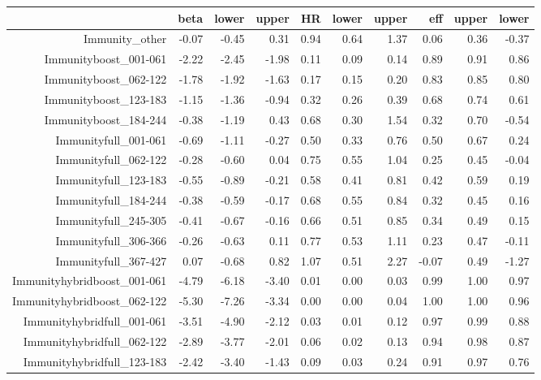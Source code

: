 \begin{table}[ht]
\centering
\begin{tabular}{rrrrrrrrrr}
  \hline
 & beta & lower & upper & HR & lower & upper & eff & upper & lower \\ 
  \hline
Immunity\_other & -0.07 & -0.45 & 0.31 & 0.94 & 0.64 & 1.37 & 0.06 & 0.36 & -0.37 \\ 
  Immunityboost\_001-061 & -2.22 & -2.45 & -1.98 & 0.11 & 0.09 & 0.14 & 0.89 & 0.91 & 0.86 \\ 
  Immunityboost\_062-122 & -1.78 & -1.92 & -1.63 & 0.17 & 0.15 & 0.20 & 0.83 & 0.85 & 0.80 \\ 
  Immunityboost\_123-183 & -1.15 & -1.36 & -0.94 & 0.32 & 0.26 & 0.39 & 0.68 & 0.74 & 0.61 \\ 
  Immunityboost\_184-244 & -0.38 & -1.19 & 0.43 & 0.68 & 0.30 & 1.54 & 0.32 & 0.70 & -0.54 \\ 
  Immunityfull\_001-061 & -0.69 & -1.11 & -0.27 & 0.50 & 0.33 & 0.76 & 0.50 & 0.67 & 0.24 \\ 
  Immunityfull\_062-122 & -0.28 & -0.60 & 0.04 & 0.75 & 0.55 & 1.04 & 0.25 & 0.45 & -0.04 \\ 
  Immunityfull\_123-183 & -0.55 & -0.89 & -0.21 & 0.58 & 0.41 & 0.81 & 0.42 & 0.59 & 0.19 \\ 
  Immunityfull\_184-244 & -0.38 & -0.59 & -0.17 & 0.68 & 0.55 & 0.84 & 0.32 & 0.45 & 0.16 \\ 
  Immunityfull\_245-305 & -0.41 & -0.67 & -0.16 & 0.66 & 0.51 & 0.85 & 0.34 & 0.49 & 0.15 \\ 
  Immunityfull\_306-366 & -0.26 & -0.63 & 0.11 & 0.77 & 0.53 & 1.11 & 0.23 & 0.47 & -0.11 \\ 
  Immunityfull\_367-427 & 0.07 & -0.68 & 0.82 & 1.07 & 0.51 & 2.27 & -0.07 & 0.49 & -1.27 \\ 
  Immunityhybridboost\_001-061 & -4.79 & -6.18 & -3.40 & 0.01 & 0.00 & 0.03 & 0.99 & 1.00 & 0.97 \\ 
  Immunityhybridboost\_062-122 & -5.30 & -7.26 & -3.34 & 0.00 & 0.00 & 0.04 & 1.00 & 1.00 & 0.96 \\ 
  Immunityhybridfull\_001-061 & -3.51 & -4.90 & -2.12 & 0.03 & 0.01 & 0.12 & 0.97 & 0.99 & 0.88 \\ 
  Immunityhybridfull\_062-122 & -2.89 & -3.77 & -2.01 & 0.06 & 0.02 & 0.13 & 0.94 & 0.98 & 0.87 \\ 
  Immunityhybridfull\_123-183 & -2.42 & -3.40 & -1.43 & 0.09 & 0.03 & 0.24 & 0.91 & 0.97 & 0.76 \\ 

\end{tabular}
\end{table}
